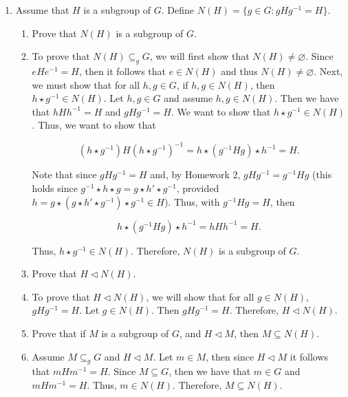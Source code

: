 \documentclass[12pt]{article}
\makeatletter
\theoremstyle{definition}
\theoremstyle{remark}
\renewenvironment{proof}[1][\proofname]{\par
  \pushQED{\qed}%
  \normalfont \topsep6\p@\@plus6\p@\relax
  \list{}{\leftmargin=0mm
          \rightmargin=0mm
          \settowidth{\itemindent}{\itshape#1}%
          \labelwidth=\itemindent
          \parsep=0pt \listparindent=\parindent 
  }
  \item[\hskip\labelsep
        \itshape
    #1\@addpunct{.}]\ignorespaces
}{%
  \popQED\endlist\@endpefalse
}
\let\oldproofname=\proofname
\renewcommand{\proofname}{\bf{\textit{\oldproofname}}}
\makeatother
\begin{document}
\begin{enumerate}[leftmargin=*]
        \item Assume that $H$ is a subgroup of $G$. Define $N(H)=\{g\in G\colon gHg^{-1}=H\}$.
            \begin{enumerate}[label=\alph*)]
                \item Prove that $N(H)$ is a subgroup of $G$.
                    \begin{proof}
                        To prove that $N(H)\subseteq_g G$, we will first show that $N(H)\neq \varnothing$. Since $eHe^{-1}=H$, then it follows that $e\in N(H)$ and thus $N(H)\neq\varnothing$. Next, we must show that for all $h,g\in G$, if $h,g\in N(H)$, then $h\star g^{-1}\in N(H)$. Let $h,g\in G$ and assume $h,g\in N(H)$. Then we have that $hHh^{-1}=H$ and $gHg^{-1}=H$. We want to show that $h\star g^{-1}\in N(H)$. Thus, we want to show that 
                            
                        \begin{equation*}
                            (h\star g^{-1})H(h\star g^{-1})^{-1}=h\star(g^{-1}Hg)\star h^{-1}=H.
                        \end{equation*}
                            
                        Note that since $gHg^{-1}=H$ and, by Homework 2, $gHg^{-1}=g^{-1}Hg$ (this holds since $g^{-1}\star h\star g=g\star h'\star g^{-1}$, provided $h=g\star(g\star h'\star g^{-1})\star g^{-1}\in H$). Thus, with $g^{-1}Hg=H$, then 
                            
                        \begin{equation*}
                            h\star(g^{-1}Hg)\star h^{-1}=hHh^{-1}=H.
                        \end{equation*}
                            
                        Thus, $h\star g^{-1}\in N(H)$. Therefore, $N(H)$ is a subgroup of $G$.
                    \end{proof}
                \item Prove that $H\triangleleft N(H)$.
                    \begin{proof}
                        To prove that $H\triangleleft N(H)$, we will show that for all $g\in N(H)$, $gHg^{-1}=H$. Let $g\in N(H)$. Then $gHg^{-1}=H$. Therefore, $H\triangleleft N(H)$.
                    \end{proof}
                \item Prove that if $M$ is a subgroup of $G$, and $H\triangleleft M$, then $M\subseteq N(H)$.
                    \begin{proof}
                        Assume $M\subseteq_g G$ and $H\triangleleft M$. Let $m\in M$, then since $H\triangleleft M$ it follows that $mHm^{-1}=H$. Since $M\subseteq G$, then we have that $m\in G$ and $mHm^{-1}=H$. Thus, $m\in N(H)$. Therefore, $M\subseteq N(H)$.
                    \end{proof}
            \end{enumerate}
                

\end{enumerate}
\end{document}
